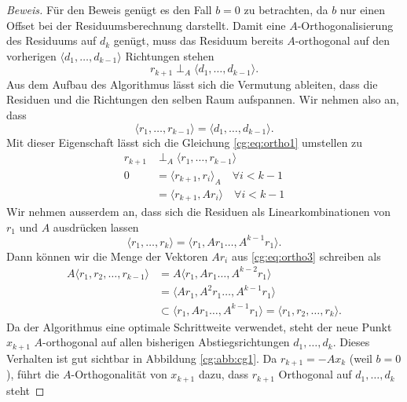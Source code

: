 \begin{proof}[Beweis]
Für den Beweis genügt es den Fall $b=0$ zu betrachten, da $b$ nur einen Offset bei der Residuumsberechnung darstellt.
Damit eine $A$-Orthogonalisierung des Residuums auf $d_k$ genügt, muss das Residuum bereits $A$-orthogonal auf den vorherigen $\langle d_1, \dots ,d_{k-1} \rangle$ Richtungen stehen
\begin{equation} \label{cg:eq:ortho1}
	r_{k+1} \perp_A \langle d_1, \dots ,d_{k-1} \rangle.
\end{equation} 
Aus dem Aufbau des Algorithmus lässt sich die Vermutung ableiten, dass die Residuen und die Richtungen den selben Raum aufspannen.
Wir nehmen also an, dass
\begin{equation}\label{cg:eq:ortho2}
\langle r_1, \dots ,r_{k-1} \rangle 
= 
\langle d_1, \dots ,d_{k-1} \rangle.
\end{equation}
Mit dieser Eigenschaft lässt sich die Gleichung \ref{cg:eq:ortho1} umstellen zu
\begin{align}\label{cg:eq:ortho3}
	r_{k+1} 	&\perp_A \langle r_1, \dots ,r_{k-1} \rangle \nonumber \\
	0 			&= \langle r_{k+1}, r_i \rangle_A \quad \forall i < k-1 \nonumber\\
				&= \langle r_{k+1}, Ar_i \rangle \quad \forall i < k-1 
\end{align} 
Wir nehmen ausserdem an, dass sich die Residuen als Linearkombinationen von $r_1$ und $A$ ausdrücken lassen
\begin{equation}
	\langle r_1, \dots ,r_k \rangle = \langle r_1, Ar_1 \dots ,A^{k-1}r_1 \rangle.
\end{equation}
Dann können wir die Menge der Vektoren $Ar_i$ aus \ref{cg:eq:ortho3} schreiben als
\begin{align}\label{cg:eq:ortho4}
	A \langle r_1, r_2, \dots , r_{k-1} \rangle &= A \langle r_1, Ar_1 \dots ,A^{k-2}r_1 \rangle \nonumber\\
												&= \langle Ar_1, A^2r_1 \dots ,A^{k-1}r_1 \rangle \nonumber\\
												&\subset \langle r_1, Ar_1 \dots ,A^{k-1}r_1 \rangle = \langle r_1, r_2, \dots , r_k \rangle.
\end{align} 
Da der Algorithmus eine optimale Schrittweite verwendet, steht der neue Punkt $x_{k+1}$ $A$-orthogonal auf allen bisherigen Abstiegsrichtungen $d_1, \dots, d_k$.
Dieses Verhalten ist gut sichtbar in Abbildung \ref{cg:abb:cg1}.
Da $r_{k+1} = -Ax_k$ (weil $b=0$), führt die $A$-Orthogonalität von $x_{k+1}$ dazu, dass $r_{k+1}$ Orthogonal auf $d_1, \dots, d_k$ steht

\end{proof}
